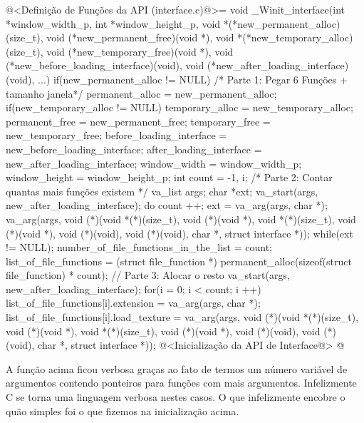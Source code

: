 \iniciocodigo
@<Definição de Funções da API (interface.c)@>=
void _Winit_interface(int *window_width_p, int *window_height_p,
                      void *(*new_permanent_alloc)(size_t),
                      void (*new_permanent_free)(void *),
                      void *(*new_temporary_alloc)(size_t),
                      void (*new_temporary_free)(void *),
                      void (*new_before_loading_interface)(void),
                      void (*new_after_loading_interface)(void), ...){
  if(new_permanent_alloc != NULL) /* Parte 1: Pegar 6 Funções + tamanho janela*/
    permanent_alloc = new_permanent_alloc;
  if(new_temporary_alloc != NULL)
    temporary_alloc = new_temporary_alloc;
  permanent_free = new_permanent_free;
  temporary_free = new_temporary_free;
  before_loading_interface = new_before_loading_interface;
  after_loading_interface = new_after_loading_interface;
  window_width = window_width_p;
  window_height = window_height_p;
  {
    int count = -1, i; /* Parte 2: Contar quantas mais funções existem */
    va_list args;
    char *ext;
    va_start(args, new_after_loading_interface);
    do{
      count ++;
      ext = va_arg(args, char *);
      va_arg(args, void (*)(void *(*)(size_t), void (*)(void *),
                            void *(*)(size_t), void (*)(void *),
                            void (*)(void), void (*)(void),
                            char *, struct interface *)); 
    } while(ext != NULL);
    number_of_file_functions_in_the_list = count;
    list_of_file_functions = (struct file_function *)
                               permanent_alloc(sizeof(struct file_function) * 
                                               count); // Parte 3: Alocar o resto
    va_start(args, new_after_loading_interface);
    for(i = 0; i < count; i ++){
      list_of_file_functions[i].extension = va_arg(args, char *);
      list_of_file_functions[i].load_texture =
             va_arg(args, void (*)(void *(*)(size_t), void (*)(void *),
                                   void *(*)(size_t), void (*)(void *),
                                   void (*)(void), void (*)(void),
                                   char *, struct interface *));
    }
  }
  @<Inicialização da API de Interface@>
}
@
\fimcodigo

A função acima ficou verbosa graças ao fato de termos um número
variável de argumentos contendo ponteiros para funções com mais
argumentos. Infelizmente C se torna uma linguagem verbosa nestes
casos. O que infelizmente encobre o quão simples foi o que fizemos na
inicialização acima.

